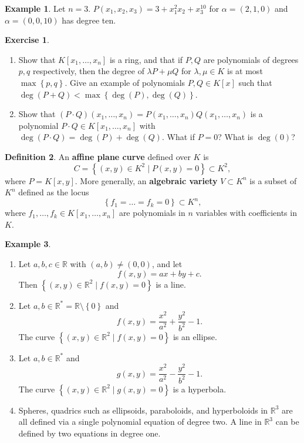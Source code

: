 \documentclass{article}
\newcommand{\R}{\mathbb{R}}
\newcommand{\rb}[1]{\left( #1 \right)}
\renewcommand{\sb}[1]{\left[ #1 \right]}
\newcommand{\cb}[1]{\left\{ #1 \right\}}
\theoremstyle{definition}\newtheorem{definition}{Definition}[section]
\theoremstyle{definition}\newtheorem{notation}[definition]{Notation}
\theoremstyle{definition}\newtheorem{remark}[definition]{Remark}
\theoremstyle{definition}\newtheorem{example}[definition]{Example}
\theoremstyle{definition}\newtheorem{fact}{Fact}
\theoremstyle{definition}\newtheorem{exercise}{Exercise}
\begin{document}
\begin{example}
Let $ n = 3 $. $ P\rb{x_1, x_2, x_3} = 3 + x_1^2x_2 + x_3^{10} $ for $ \alpha = \rb{2, 1, 0} $ and $ \alpha = \rb{0, 0, 10} $ has degree ten.
\end{example}

\begin{exercise}
\hfill
\begin{enumerate}
\item Show that $ K\sb{x_1, \dots, x_n} $ is a ring, and that if $ P, Q $ are polynomials of degrees $ p, q $ respectively, then the degree of $ \lambda P + \mu Q $ for $ \lambda, \mu \in K $ is at most $ \max\cb{p, q} $. Give an example of polynomials $ P, Q \in K\sb{x} $ such that $ \deg\rb{P + Q} < \max\cb{\deg\rb{P}, \deg\rb{Q}} $.
\item Show that $ \rb{P \cdot Q}\rb{x_1, \dots, x_n} = P\rb{x_1, \dots, x_n}Q\rb{x_1, \dots, x_n} $ is a polynomial $ P \cdot Q \in K\sb{x_1, \dots, x_n} $ with $ \deg\rb{P \cdot Q} = \deg\rb{P} + \deg\rb{Q} $. What if $ P = 0 $? What is $ \deg\rb{0} $?
\end{enumerate}
\end{exercise}

\begin{definition}
An \textbf{affine plane curve} defined over $ K $ is
$$ C = \cb{\rb{x, y} \in K^2 \mid P\rb{x, y} = 0} \subset K^2, $$
where $ P = K\sb{x, y} $. More generally, an \textbf{algebraic variety} $ V \subset K^n $ is a subset of $ K^n $ defined as the locus
$$ \cb{f_1 = \dots = f_k = 0} \subset K^n, $$
where $ f_1, \dots, f_k \in K\sb{x_1, \dots, x_n} $ are polynomials in $ n $ variables with coefficients in $ K $.
\end{definition}

\begin{example}
\hfill
\begin{enumerate}
\item Let $ a, b, c \in \R $ with $ \rb{a, b} \ne \rb{0, 0} $, and let
$$ f\rb{x, y} = ax + by + c. $$
Then $ \cb{\rb{x, y} \in \R^2 \mid f\rb{x, y} = 0} $ is a line.
\item Let $ a, b \in \R^* = \R \setminus \cb{0} $ and
$$ f\rb{x, y} = \dfrac{x^2}{a^2} + \dfrac{y^2}{b^2} - 1. $$
The curve $ \cb{\rb{x, y} \in \R^2 \mid f\rb{x, y} = 0} $ is an ellipse.
\item Let $ a, b \in \R^* $ and
$$ g\rb{x, y} = \dfrac{x^2}{a^2} - \dfrac{y^2}{b^2} - 1. $$
The curve $ \cb{\rb{x, y} \in \R^2 \mid g\rb{x, y} = 0} $ is a hyperbola.
\item Spheres, quadrics such as ellipsoids, paraboloids, and hyperboloids in $ \R^3 $ are all defined via a single polynomial equation of degree two. A line in $ \R^3 $ can be defined by two equations in degree one.
\end{enumerate}
\end{example}
\end{document}
